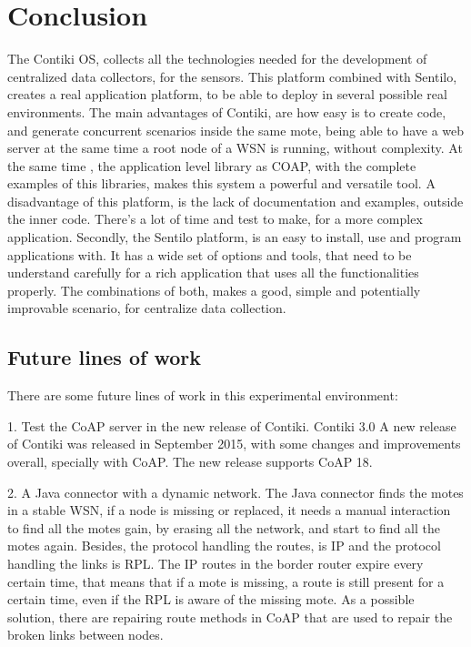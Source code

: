 \section{Conclusion}

The Contiki OS,
	collects all the technologies needed for the development of centralized data collectors,
	for the sensors.
This platform combined with Sentilo,
	creates a real application platform,
	to be able to deploy in several possible real environments.
The main advantages of Contiki,
	are how easy is to create code,
	and generate concurrent scenarios inside the same mote,
	being able to have a web server at the same time a root node of a WSN is running,
	without complexity.
At the same time ,
	the application level library as COAP,
	with the complete examples of this libraries,
	makes this system a powerful and versatile tool.
A disadvantage of this platform,
	is the lack of documentation and examples,
	outside the inner code.
There's a lot of time and test to make,
	for a more complex application.
Secondly,
	the Sentilo platform,
	is an easy to install,
	use and program applications with.
It has a wide set of options and tools,
	that need to be understand carefully for a rich application that uses all the functionalities properly.
The combinations of both,
	makes a good,
	simple and potentially improvable scenario,
	for centralize data collection.

\subsection{Future lines of work}

There are some future lines of work in this experimental environment: 

1. Test the CoAP server in the new release of Contiki.
Contiki 3.0 A new release of Contiki was released in September 2015,
	with some changes and improvements overall,
	specially with CoAP.
The new release supports CoAP 18.

2. A Java connector with a dynamic network.
The Java connector finds the motes in a stable WSN,
	if a node is missing or replaced,
	it needs a manual interaction to find all the motes gain,
	by erasing all the network,
	and start to find all the motes again.
Besides,
	the protocol handling the routes,
	is IP and the protocol handling the links is RPL.
The IP routes in the border router expire every certain time,
	that means that if a mote is missing,
	a route is still present for a certain time,
	even if the RPL is aware of the missing mote.
As a possible solution,
	there are repairing route methods in CoAP that are used to repair the broken links between nodes.


